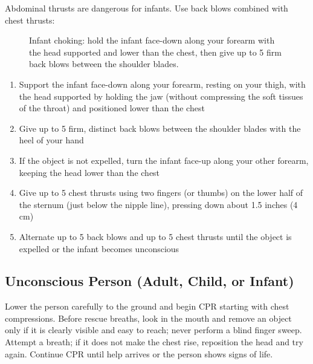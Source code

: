 Abdominal thrusts are dangerous for infants. Use back blows combined with chest thrusts:

\begin{figure}[h]
\centering
{}
\caption{Infant choking: hold the infant face-down along your forearm with the head supported and lower than the chest, then give up to 5 firm back blows between the shoulder blades.}
\label{fig:infant_backblows}
\end{figure}

\begin{enumerate}[leftmargin=*]
\item Support the infant face-down along your forearm, resting on your thigh, with the head supported by holding the jaw (without compressing the soft tissues of the throat) and positioned lower than the chest
\item Give up to 5 firm, distinct back blows between the shoulder blades with the heel of your hand
\item If the object is not expelled, turn the infant face-up along your other forearm, keeping the head lower than the chest
\item Give up to 5 chest thrusts using two fingers (or thumbs) on the lower half of the sternum (just below the nipple line), pressing down about 1.5 inches (4 cm)
\item Alternate up to 5 back blows and up to 5 chest thrusts until the object is expelled or the infant becomes unconscious
\end{enumerate}
\subsection{Unconscious Person (Adult, Child, or Infant)}

Lower the person carefully to the ground and begin CPR starting with chest compressions. Before rescue breaths, look in the mouth and remove an object only if it is clearly visible and easy to reach; never perform a blind finger sweep. Attempt a breath; if it does not make the chest rise, reposition the head and try again. Continue CPR until help arrives or the person shows signs of life.

